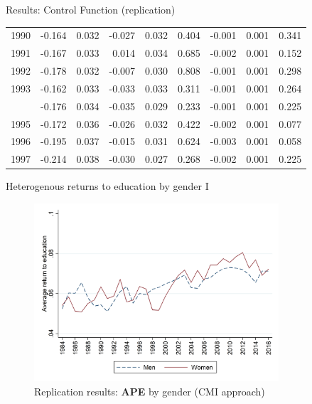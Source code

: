 \documentclass[10pt,ignorenonframetext,]{beamer}
\begin{document}
\begin{frame}{Results: Control Function (replication)}
\begin{longtable}[t]{rrrrrrrrr}
1990 & -0.164 & 0.032 & -0.027 & 0.032 & 0.404 & -0.001 & 0.001 & 0.341\\
1991 & -0.167 & 0.033 & 0.014 & 0.034 & 0.685 & -0.002 & 0.001 & 0.152\\
1992 & -0.178 & 0.032 & -0.007 & 0.030 & 0.808 & -0.001 & 0.001 & 0.298\\
1993 & -0.162 & 0.033 & -0.033 & 0.033 & 0.311 & -0.001 & 0.001 & 0.264\\
\addlinespace
1994 & -0.176 & 0.034 & -0.035 & 0.029 & 0.233 & -0.001 & 0.001 & 0.225\\
1995 & -0.172 & 0.036 & -0.026 & 0.032 & 0.422 & -0.002 & 0.001 & 0.077\\
1996 & -0.195 & 0.037 & -0.015 & 0.031 & 0.624 & -0.003 & 0.001 & 0.058\\
1997 & -0.214 & 0.038 & -0.030 & 0.027 & 0.268 & -0.002 & 0.001 & 0.225\\*
\end{longtable}\endgroup{}

\end{frame}

\begin{frame}{Heterogenous returns to education by gender I}
\protect\hypertarget{heterogenous-returns-to-education-by-gender-i}{}

\begin{figure}
\centering
\includegraphics[width=\textwidth,height=2.60417in]{img/results_sex.png}
\caption{Replication results: \textbf{APE} by gender (CMI approach)}
\end{figure}

\end{frame}
\end{document}
